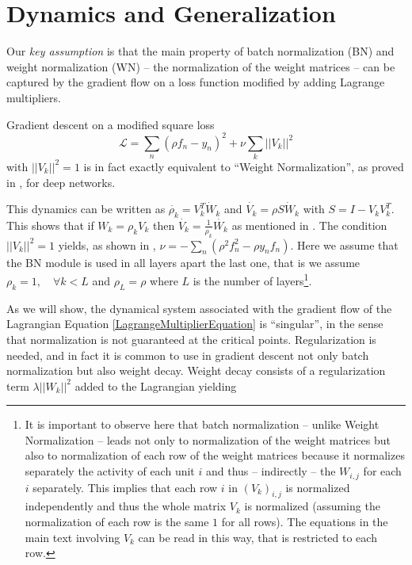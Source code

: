 \documentclass[11pt]{article}
\begin{document}
\section{Dynamics and Generalization}
\label{Lagrange}

Our {\it key assumption} is that the main property of batch
normalization (BN) and weight normalization (WN) -- the normalization
of the weight matrices -- can be captured by 
the  gradient flow on a loss function modified by adding Lagrange
multipliers.

Gradient descent on a modified square loss
\begin{equation}
\mathcal{L}=\sum_n(\rho f_n-y_n)^2 +
\nu \sum_k ||V_k||^2
\label{LagrangeMultiplierEquation}
\end{equation} 
\noindent with $ ||V_k||^2=1$
is in fact exactly equivalent to ``Weight Normalization'', as proved in \cite{theory_III}, for deep
networks.

This  dynamics can be written as
        $\dot{\rho_k} =V_k^T \dot{W}_k$ and
        $\dot{V_k}= \rho S \dot{W}_k$ with $S=I-V_k V_k^T$. This shows
        that if $W_k= \rho_k V_k$ then
        $\dot{V_k}= \frac{1}{\rho_k} \dot{W_k}$ as mentioned in
        \cite{DBLP:journals/corr/abs-1812-03981}.  The condition
        $||V_k||^2=1$  yields, as shown in \cite{PoggioLiaoArxiv2020},  $\nu= - \sum_n(\rho^2
          f_n^2- \rho y_n f_n)$.
Here we assume  that the BN module is used in all layers apart the
last one, that is we assume
        $\rho_k= 1, \quad \forall k<L$ and $\rho_L=\rho$ where $L$ is
        the number of layers\footnote{It is important to observe here that
        batch normalization -- unlike Weight Normalization --  leads
        not only to
          normalization of the weight matrices but also to
          normalization of each row of the weight matrices
          \cite{theory_III} because it normalizes separately the
          activity of each unit
          $i$ and thus -- indirectly -- the $W_{i,j}$ for each $i$ separately. This 
          implies that each
          row $i$ in $(V_k)_{i,j}$ is normalized independently and thus the whole
          matrix $V_k$ is normalized (assuming the normalization of
          each row is the same $1$ for all rows). The equations in the
          main text involving $V_k$ can be read in this way, that is
          restricted to each row.}.


          As we will show, the dynamical system associated with the
          gradient flow of the Lagrangian Equation
          \ref{LagrangeMultiplierEquation} is ``singular'', in the
          sense that normalization is not guaranteed at the critical
          points. Regularization is needed, and in fact it is common to
          use in gradient descent not only batch normalization but
          also weight decay.  Weight decay consists of a regularization
          term $\lambda ||W_k||^2$ added to the Lagrangian yielding
\end{document}
